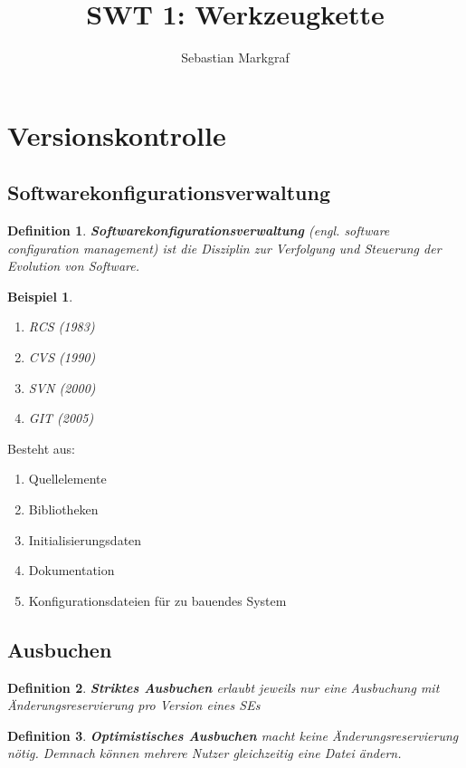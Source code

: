 \documentclass[a4paper]{article}
\title{SWT 1: Werkzeugkette}
\author{Sebastian Markgraf}
\theoremstyle{break}
\newtheorem{defi}{Definition}[section]
\newtheorem{ex}{Beispiel}[section]
\begin{document}
    \maketitle
    \newpage

    \section{Versionskontrolle}
    \subsection{Softwarekonfigurationsverwaltung}
    \begin{defi}
      \textbf{Softwarekonfigurationsverwaltung} (engl. software configuration management) ist die Disziplin zur Verfolgung und Steuerung der Evolution von Software.
    \end{defi}

    \begin{ex}
      \begin {enumerate}
        \item RCS (1983)
        \item CVS (1990)
        \item SVN (2000)
        \item GIT (2005)
      \end {enumerate}
    \end{ex}
    
    Besteht aus:
    \begin{enumerate}
    \item Quellelemente
    \item Bibliotheken
    \item Initialisierungsdaten
    \item Dokumentation
    \item Konfigurationsdateien für zu bauendes System  
    \end{enumerate}

    \subsection{Ausbuchen}
    \begin {defi}
      \textbf{Striktes Ausbuchen} erlaubt jeweils nur eine Ausbuchung mit Änderungsreservierung pro Version eines SEs
    \end {defi}

    \begin {defi}
      \textbf{Optimistisches Ausbuchen} macht keine Änderungsreservierung nötig. Demnach können mehrere Nutzer gleichzeitig eine Datei ändern.
    \end {defi}
\end{document}
